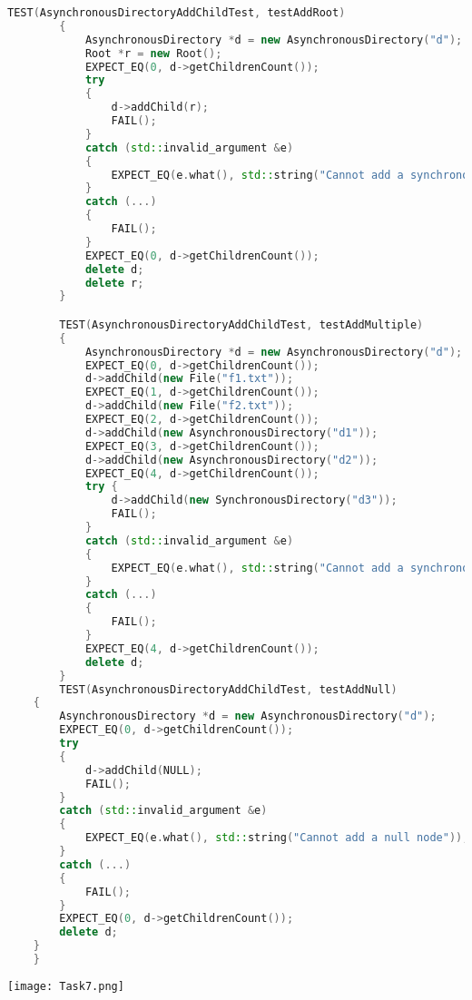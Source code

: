 \documentclass{article}
\begin{document}
\begin{lstlisting}[language=C++]
        TEST(AsynchronousDirectoryAddChildTest, testAddRoot)
        {
            AsynchronousDirectory *d = new AsynchronousDirectory("d");
            Root *r = new Root();
            EXPECT_EQ(0, d->getChildrenCount());
            try
            {
                d->addChild(r);
                FAIL();
            }
            catch (std::invalid_argument &e)
            {
                EXPECT_EQ(e.what(), std::string("Cannot add a synchronous node to an asynchronous directory"));
            }
            catch (...)
            {
                FAIL();
            }
            EXPECT_EQ(0, d->getChildrenCount());
            delete d;
            delete r;
        }

        TEST(AsynchronousDirectoryAddChildTest, testAddMultiple)
        {
            AsynchronousDirectory *d = new AsynchronousDirectory("d");
            EXPECT_EQ(0, d->getChildrenCount());
            d->addChild(new File("f1.txt"));
            EXPECT_EQ(1, d->getChildrenCount());
            d->addChild(new File("f2.txt"));
            EXPECT_EQ(2, d->getChildrenCount());
            d->addChild(new AsynchronousDirectory("d1"));
            EXPECT_EQ(3, d->getChildrenCount());
            d->addChild(new AsynchronousDirectory("d2"));
            EXPECT_EQ(4, d->getChildrenCount());
            try {
                d->addChild(new SynchronousDirectory("d3"));
                FAIL();
            }
            catch (std::invalid_argument &e)
            {
                EXPECT_EQ(e.what(), std::string("Cannot add a synchronous node to an asynchronous directory"));
            }
            catch (...)
            {
                FAIL();
            }
            EXPECT_EQ(4, d->getChildrenCount());
            delete d;
        }
        TEST(AsynchronousDirectoryAddChildTest, testAddNull)
    {
        AsynchronousDirectory *d = new AsynchronousDirectory("d");
        EXPECT_EQ(0, d->getChildrenCount());
        try
        {
            d->addChild(NULL);
            FAIL();
        }
        catch (std::invalid_argument &e)
        {
            EXPECT_EQ(e.what(), std::string("Cannot add a null node"));
        }
        catch (...)
        {
            FAIL();
        }
        EXPECT_EQ(0, d->getChildrenCount());
        delete d;
    }
    }
\end{lstlisting}
\texttt{[image: Task7.png]}
\end{document}
